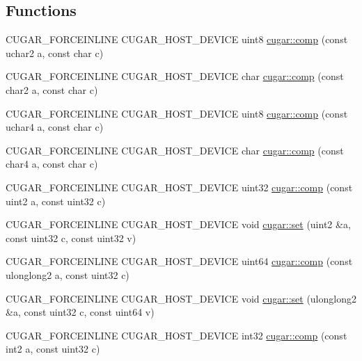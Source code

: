 \subsection*{Functions}
\begin{DoxyCompactItemize}
\item 
C\+U\+G\+A\+R\+\_\+\+F\+O\+R\+C\+E\+I\+N\+L\+I\+NE C\+U\+G\+A\+R\+\_\+\+H\+O\+S\+T\+\_\+\+D\+E\+V\+I\+CE uint8 \hyperlink{group___basic_gae73662ac7ace330f8b3f726381785f28}{cugar\+::comp} (const uchar2 a, const char c)
\item 
C\+U\+G\+A\+R\+\_\+\+F\+O\+R\+C\+E\+I\+N\+L\+I\+NE C\+U\+G\+A\+R\+\_\+\+H\+O\+S\+T\+\_\+\+D\+E\+V\+I\+CE char \hyperlink{group___basic_ga8496934a659f5521de74af54b0805e37}{cugar\+::comp} (const char2 a, const char c)
\item 
C\+U\+G\+A\+R\+\_\+\+F\+O\+R\+C\+E\+I\+N\+L\+I\+NE C\+U\+G\+A\+R\+\_\+\+H\+O\+S\+T\+\_\+\+D\+E\+V\+I\+CE uint8 \hyperlink{group___basic_gaa695cfa1e048a121c9cbdf1e543d7f1b}{cugar\+::comp} (const uchar4 a, const char c)
\item 
C\+U\+G\+A\+R\+\_\+\+F\+O\+R\+C\+E\+I\+N\+L\+I\+NE C\+U\+G\+A\+R\+\_\+\+H\+O\+S\+T\+\_\+\+D\+E\+V\+I\+CE char \hyperlink{group___basic_gac54a46b198c76c9c29ccfca71fb5a71b}{cugar\+::comp} (const char4 a, const char c)
\item 
C\+U\+G\+A\+R\+\_\+\+F\+O\+R\+C\+E\+I\+N\+L\+I\+NE C\+U\+G\+A\+R\+\_\+\+H\+O\+S\+T\+\_\+\+D\+E\+V\+I\+CE uint32 \hyperlink{group___basic_ga5831bedd2e38ee10534adde39ab79f2c}{cugar\+::comp} (const uint2 a, const uint32 c)
\item 
C\+U\+G\+A\+R\+\_\+\+F\+O\+R\+C\+E\+I\+N\+L\+I\+NE C\+U\+G\+A\+R\+\_\+\+H\+O\+S\+T\+\_\+\+D\+E\+V\+I\+CE void \hyperlink{group___basic_gab1b928f43d089426870dc0afd011395c}{cugar\+::set} (uint2 \&a, const uint32 c, const uint32 v)
\item 
C\+U\+G\+A\+R\+\_\+\+F\+O\+R\+C\+E\+I\+N\+L\+I\+NE C\+U\+G\+A\+R\+\_\+\+H\+O\+S\+T\+\_\+\+D\+E\+V\+I\+CE uint64 \hyperlink{group___basic_ga82749940d0c34c292e2761ecf2c3f1e3}{cugar\+::comp} (const ulonglong2 a, const uint32 c)
\item 
C\+U\+G\+A\+R\+\_\+\+F\+O\+R\+C\+E\+I\+N\+L\+I\+NE C\+U\+G\+A\+R\+\_\+\+H\+O\+S\+T\+\_\+\+D\+E\+V\+I\+CE void \hyperlink{group___basic_gabe33a8750c36216a280b69f972f662c5}{cugar\+::set} (ulonglong2 \&a, const uint32 c, const uint64 v)
\item 
C\+U\+G\+A\+R\+\_\+\+F\+O\+R\+C\+E\+I\+N\+L\+I\+NE C\+U\+G\+A\+R\+\_\+\+H\+O\+S\+T\+\_\+\+D\+E\+V\+I\+CE int32 \hyperlink{group___basic_gab9628292c5eb84f4597f8e345b79cba2}{cugar\+::comp} (const int2 a, const uint32 c)

\end{DoxyCompactItemize}

